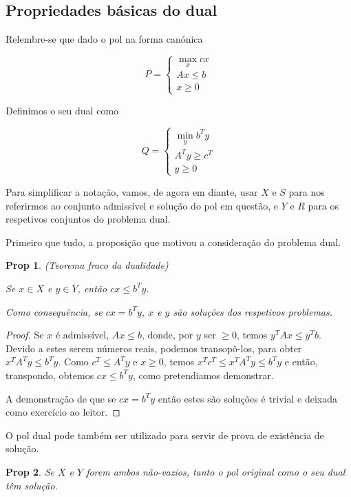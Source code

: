 \documentclass{article}
\newtheorem{prop}{Prop}
\theoremstyle{definition}
\begin{document}
	\subsection{Propriedades básicas do dual}
	
	Relembre-se que dado o pol na forma canónica
	
	\[
	P =
	\begin{cases}
	\max\limits_x cx\\
	Ax \leq b\\
	x \geq 0
	\end{cases}
	\]
	
	Definimos o seu dual como
	
	\[
	Q =
	\begin{cases}
	\min\limits_y b^T y\\
	A^T y \geq c^T\\
	y \geq 0
	\end{cases}
	\]
	
	Para simplificar a notação, vamos, de agora em diante, usar $X$ e $S$ para nos referirmos ao conjunto admissível e solução do pol em questão, e $Y$ e $R$ para os respetivos conjuntos do problema dual.
	
	Primeiro que tudo, a proposição que motivou a consideração do problema dual.
	
	\begin{prop} (Teorema fraco da dualidade)
	
	Se $x \in X$ e $y \in Y$, então $cx \leq b^T y$.
	
	Como consequência, se $cx = b^T y$, $x$ e $y$ são soluções dos respetivos problemas.
	\end{prop}
	
	\begin{proof}
	Se $x$ é admissível, $Ax \leq b$, donde, por $y$ ser $\geq 0$, temos $y^T A x \leq y^T b$. Devido a estes serem números reais, podemos transopô-los, para obter $x^T A^T y \leq b^T y$. Como $c^T \leq A^T y$ e $x \geq 0$, temos $x^T c^T \leq x^T A^T y \leq b^T y$ e então, transpondo, obtemos $cx \leq b^T y$, como pretendiamos demonstrar.
	
	A demonstração de que se $cx = b^T y$ então estes são soluções é trivial e deixada como exercício ao leitor.
	\end{proof}
	
	O pol dual pode também ser utilizado para servir de prova de existência de solução.
	
	\begin{prop}
	Se $X$ e $Y$ forem ambos não-vazios, tanto o pol original como o seu dual têm solução.
	\end{prop}
	
\end{document}
